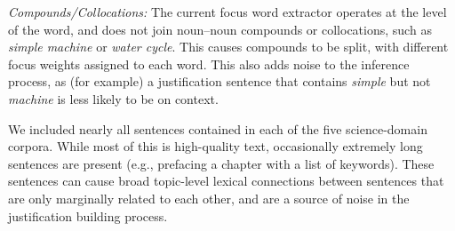 {\flushleft \emph{Compounds/Collocations: }}
The current focus word extractor operates at the level of the word, and does not join noun--noun compounds or collocations, such as \emph{simple machine} or \emph{water cycle}.  This causes compounds to be split, with different focus weights assigned to each word.  This also adds noise to the inference process, as (for example) a justification sentence that contains \emph{simple} but not \emph{machine} is less likely to be on context. 
  

{}
We included nearly all sentences contained in each of the five science-domain corpora.  While most of this is high-quality text, occasionally extremely long sentences are present (e.g., prefacing a chapter with a list of keywords).  These sentences can cause broad topic-level lexical connections between sentences that are only marginally related to each other, and are a source of noise in the justification building process.  



 
